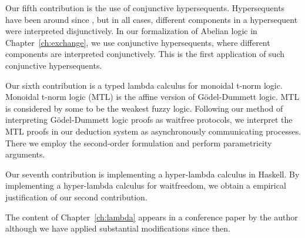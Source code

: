 Our fifth contribution is the use of conjunctive hypersequents.
Hypersequents have been around since \citet{avron91}, but
in all cases, different components in a hypersequent were interpreted
disjunctively.
In our formalization of Abelian logic in Chapter~\ref{ch:exchange},
we use conjunctive hypersequents, where different components are
interpreted conjunctively.
This is the first application of such conjunctive hypersequents.

Our sixth contribution is a typed lambda calculus for monoidal
t-norm logic.  Monoidal t-norm logic (MTL) is the affine version of
G\"odel-Dummett logic.
MTL is considered by some to be the weakest fuzzy logic.
Following our method of interpreting G\"odel-Dummett logic proofs as
waitfree protocols, we interpret the MTL proofs in our deduction system
as asynchronously communicating processes.
There we employ the second-order formulation and perform parametricity
arguments.

Our seventh contribution is implementing a hyper-lambda calculus in
Haskell.
By implementing a hyper-lambda calculus for waitfreedom,
we obtain a empirical justification of our second contribution.

The content of Chapter~\ref{ch:lambda} appears in
a conference paper by the author \citep{hiraiflops2012}
although we have applied substantial modifications since then.



